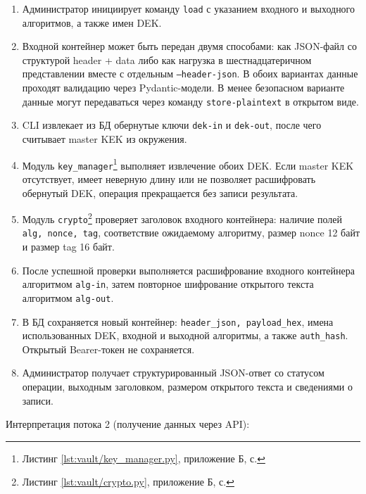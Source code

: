 \documentclass[14pt, a4paper]{extarticle}
\newcommand{\listingsappendix}{Б}
\newcommand{\listingfootnote}[1]{\footnote{Листинг \ref{#1}, приложение \listingsappendix{}, с. \pageref{#1}}}
\begin{document}
	\begin{enumerate}
	    \item Администратор инициирует команду \texttt{load} с указанием входного и выходного алгоритмов, а также имен DEK.
	    \item Входной контейнер может быть передан двумя способами: как JSON-файл со структурой header + data либо как нагрузка в шестнадцатеричном представлении вместе с отдельным \texttt{--header-json}. В обоих вариантах данные проходят валидацию через Pydantic-модели. В менее безопасном варианте данные могут передаваться через команду \texttt{store-plaintext} в открытом виде.
	    \item CLI извлекает из БД обернутые ключи \texttt{dek-in} и \texttt{dek-out}, после чего считывает master KEK из окружения.
	    \item Модуль \texttt{key\_manager}\listingfootnote{lst:vault/key_manager.py} выполняет извлечение обоих DEK. Если master KEK отсутствует, имеет неверную длину или не позволяет расшифровать обернутый DEK, операция прекращается без записи результата.
	    \item Модуль \texttt{crypto}\listingfootnote{lst:vault/crypto.py} проверяет заголовок входного контейнера: наличие полей \texttt{alg, nonce, tag}, соответствие ожидаемому алгоритму, размер nonce 12 байт и размер tag 16 байт.
	    \item После успешной проверки выполняется расшифрование входного контейнера алгоритмом \texttt{alg-in}, затем повторное шифрование открытого текста алгоритмом \texttt{alg-out}.
	    \item В БД сохраняется новый контейнер: \texttt{header\_json, payload\_hex}, имена использованных DEK, входной и выходной алгоритмы, а также \texttt{auth\_hash}. Открытый Bearer-токен не сохраняется.
	    \item Администратор получает структурированный JSON-ответ со статусом операции, выходным заголовком, размером открытого текста и сведениями о записи.
	\end{enumerate}
	
	Интерпретация потока 2 (получение данных через API):
	
\end{document}

